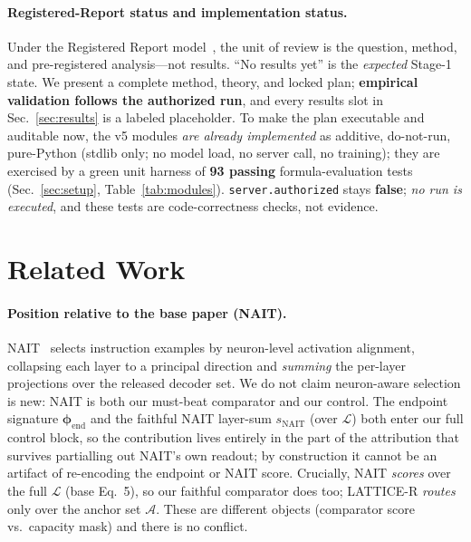\documentclass[11pt]{article}
\theoremstyle{definition}
\newcommand{\phend}{\bm{\phi}_{\mathrm{end}}}
\newcommand{\Aset}{\mathcal{A}}
\newcommand{\Lset}{\mathcal{L}}
\begin{document}
\paragraph{Registered-Report status and implementation status.}
Under the Registered Report model~\cite{chambers2014registered}, the unit of review is
the question, method, and pre-registered analysis---not results. ``No results yet'' is
the \emph{expected} Stage-1 state. We present a complete method, theory, and locked plan;
\textbf{empirical validation follows the authorized run}, and every results slot in
Sec.~\ref{sec:results} is a labeled placeholder. To make the plan executable and
auditable now, the v5 modules \emph{are already implemented} as additive, do-not-run,
pure-Python (stdlib only; no model load, no server call, no training); they are
exercised by a green unit harness of \textbf{93 passing} formula-evaluation tests
(Sec.~\ref{sec:setup}, Table~\ref{tab:modules}). \texttt{server.authorized} stays
\textbf{false}; \emph{no run is executed}, and these tests are code-correctness checks,
not evidence.

\section{Related Work}
\label{sec:related}

\paragraph{Position relative to the base paper (NAIT).}
NAIT~\cite{nait2026} selects instruction examples by neuron-level activation alignment,
collapsing each layer to a principal direction and \emph{summing} the per-layer
projections over the released decoder set. We do not claim neuron-aware selection is new:
NAIT is both our must-beat comparator and our control. The endpoint signature $\phend$
and the faithful NAIT layer-sum $s_{\mathrm{NAIT}}$ (over $\Lset$) both enter our full
control block, so the contribution lives entirely in the part of the attribution that
survives partialling out NAIT's own readout; by construction it cannot be an artifact of
re-encoding the endpoint or NAIT score. Crucially, NAIT \emph{scores} over the full
$\Lset$ (base Eq.~5), so our faithful comparator does too; LATTICE-R \emph{routes} only
over the anchor set $\Aset$. These are different objects (comparator score vs.\ capacity
mask) and there is no conflict.
\end{document}

